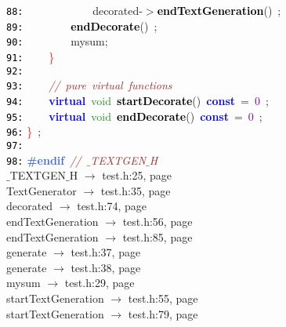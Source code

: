 \documentclass{article}
\begin{document}
\mbox{}\texttt{\textcolor{Black}{88:}} \ \ \ \ \ \ \ \ \ \ \ \ decorated\textcolor{BrickRed}{-$>$}\textbf{\textcolor{Black}{endTextGeneration}}\textcolor{BrickRed}{()}\ \textcolor{BrickRed}{;} \\
\mbox{}\texttt{\textcolor{Black}{89:}} \ \ \ \ \ \ \ \ \textbf{\textcolor{Black}{endDecorate}}\textcolor{BrickRed}{()}\ \textcolor{BrickRed}{;} \\
\mbox{}\texttt{\textcolor{Black}{90:}} \ \ \ \ \ \ \ \ mysum\textcolor{BrickRed}{;} \\
\mbox{}\texttt{\textcolor{Black}{91:}} \ \ \ \ \textcolor{Red}{\}} \\
\mbox{}\texttt{\textcolor{Black}{92:}}  \\
\mbox{}\texttt{\textcolor{Black}{93:}} \ \ \ \ \textit{\textcolor{Brown}{//\ pure\ virtual\ functions}} \\
\mbox{}\texttt{\textcolor{Black}{94:}} \ \ \ \ \textbf{\textcolor{Blue}{virtual}}\ \textcolor{ForestGreen}{void}\ \textbf{\textcolor{Black}{startDecorate}}\textcolor{BrickRed}{()}\ \textbf{\textcolor{Blue}{const}}\ \textcolor{BrickRed}{=}\ \textcolor{Purple}{0}\ \textcolor{BrickRed}{;} \\
\mbox{}\texttt{\textcolor{Black}{95:}} \ \ \ \ \textbf{\textcolor{Blue}{virtual}}\ \textcolor{ForestGreen}{void}\ \textbf{\textcolor{Black}{endDecorate}}\textcolor{BrickRed}{()}\ \textbf{\textcolor{Blue}{const}}\ \textcolor{BrickRed}{=}\ \textcolor{Purple}{0}\ \textcolor{BrickRed}{;} \\
\mbox{}\texttt{\textcolor{Black}{96:}} \textcolor{Red}{\}}\ \textcolor{BrickRed}{;} \\
\mbox{}\texttt{\textcolor{Black}{97:}}  \\
\mbox{}\texttt{\textcolor{Black}{98:}} \textbf{\textcolor{RoyalBlue}{\#endif}}\ \textit{\textcolor{Brown}{//\ $\_$TEXTGEN$\_$H}} \\
\mbox{}{\hfill $\_$TEXTGEN$\_$H $\rightarrow$ test.h:25, page~\pageref{test.h:25}} \\
\mbox{}{\hfill TextGenerator $\rightarrow$ test.h:35, page~\pageref{test.h:35}} \\
\mbox{}{\hfill decorated $\rightarrow$ test.h:74, page~\pageref{test.h:74}} \\
\mbox{}{\hfill endTextGeneration $\rightarrow$ test.h:56, page~\pageref{test.h:56}} \\
\mbox{}{\hfill endTextGeneration $\rightarrow$ test.h:85, page~\pageref{test.h:85}} \\
\mbox{}{\hfill generate $\rightarrow$ test.h:37, page~\pageref{test.h:37}} \\
\mbox{}{\hfill generate $\rightarrow$ test.h:38, page~\pageref{test.h:38}} \\
\mbox{}{\hfill mysum $\rightarrow$ test.h:29, page~\pageref{test.h:29}} \\
\mbox{}{\hfill startTextGeneration $\rightarrow$ test.h:55, page~\pageref{test.h:55}} \\
\mbox{}{\hfill startTextGeneration $\rightarrow$ test.h:79, page~\pageref{test.h:79}} \\
\end{document}
